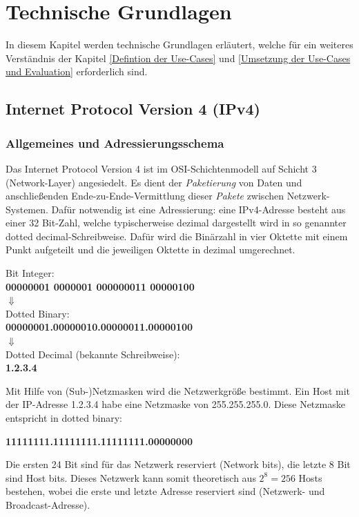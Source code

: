 \chapter{Technische Grundlagen} \label{Technische_Grundlagen}
In diesem Kapitel werden technische Grundlagen erläutert, welche für ein weiteres Verständnis der Kapitel \ref{Defintion der Use-Cases} und \ref{Umsetzung der Use-Cases und Evaluation} erforderlich sind.

\section{Internet Protocol Version 4 (IPv4)} \label{ipv4}
\subsection{Allgemeines und Adressierungsschema}
Das Internet Protocol Version 4 ist im \gls{OSI-Schichtenmodell} auf Schicht 3 (Network-Layer) angesiedelt\cite{itu1994}. Es dient der \textit{Paketierung} von Daten und anschließenden Ende-zu-Ende-Vermittlung dieser \textit{Pakete} zwischen Netzwerk-Systemen. Dafür notwendig ist eine Adressierung: eine IPv4-Adresse besteht aus einer 32 Bit-Zahl, welche typischerweise dezimal dargestellt wird in so genannter \glqq dotted decimal\grqq{}-Schreibweise. Dafür wird die Binärzahl in vier Oktette mit einem Punkt aufgeteilt und die jeweiligen Oktette in dezimal umgerechnet.

{ Bit Integer:\\
\textbf{00000001 0000001 000000011 00000100}\\
$\Downarrow$\\
\glqq Dotted Binary\grqq{}:\\
\textbf{00000001.00000010.00000011.00000100}\\
$\Downarrow$\\
Dotted Decimal (bekannte Schreibweise):\\
{\textbf{1.2.3.4}}\par}

Mit Hilfe von (Sub-)Netzmasken wird die Netzwerkgröße bestimmt. Ein Host mit der IP-Adresse 1.2.3.4 habe eine Netzmaske von 255.255.255.0. Diese Netzmaske entspricht in dotted binary:

{\centering\textbf{11111111.11111111.11111111.00000000}\par}

Die ersten 24 Bit sind für das Netzwerk reserviert (Network bits), die letzte 8 Bit sind Host bits. Dieses Netzwerk kann somit theoretisch aus $2^8 = 256$ Hosts bestehen, wobei die erste und letzte Adresse reserviert sind (Netzwerk- und Broadcast-Adresse).

